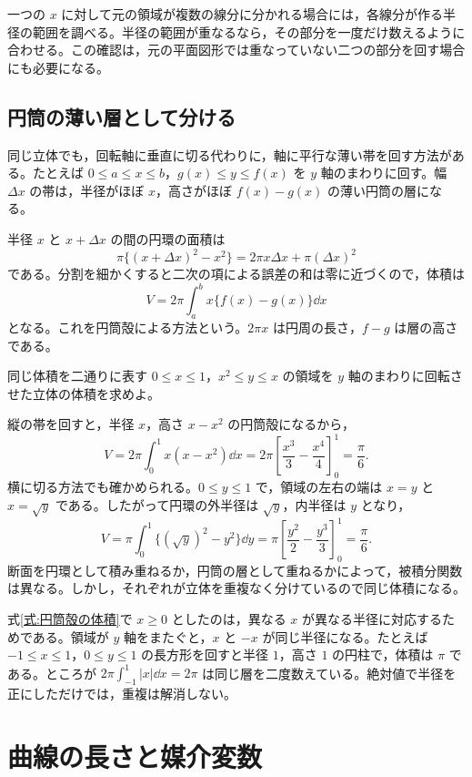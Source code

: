 一つの $x$ に対して元の領域が複数の線分に分かれる場合には，各線分が作る半径の範囲を調べる。半径の範囲が重なるなら，その部分を一度だけ数えるように合わせる。この確認は，元の平面図形では重なっていない二つの部分を回す場合にも必要になる。

\subsection{円筒の薄い層として分ける}

同じ立体でも，回転軸に垂直に切る代わりに，軸に平行な薄い帯を回す方法がある。たとえば $0\leq a\leq x\leq b$，$g(x)\leq y\leq f(x)$ を $y$ 軸のまわりに回す。幅 $\Delta x$ の帯は，半径がほぼ $x$，高さがほぼ $f(x)-g(x)$ の薄い円筒の層になる。

半径 $x$ と $x+\Delta x$ の間の円環の面積は
\[
\pi\{(x+\Delta x)^2-x^2\}
 =2\pi x\Delta x+\pi(\Delta x)^2
\]
である。分割を細かくすると二次の項による誤差の和は零に近づくので，体積は
\begin{equation}\label{式:円筒殻の体積}
V=2\pi\int_a^b x\{f(x)-g(x)\}\dd x
\end{equation}
となる。これを円筒殻による方法という。$2\pi x$ は円周の長さ，$f-g$ は層の高さである。

\begin{example}{同じ体積を二通りに表す}
$0\leq x\leq1$，$x^2\leq y\leq x$ の領域を $y$ 軸のまわりに回転させた立体の体積を求めよ。
\end{example}

縦の帯を回すと，半径 $x$，高さ $x-x^2$ の円筒殻になるから，
\[
V=2\pi\int_0^1x(x-x^2)\dd x
 =2\pi\left[\frac{x^3}{3}-\frac{x^4}{4}\right]_0^1
 =\frac{\pi}{6}.
\]
横に切る方法でも確かめられる。$0\leq y\leq1$ で，領域の左右の端は $x=y$ と $x=\sqrt y$ である。したがって円環の外半径は $\sqrt y$，内半径は $y$ となり，
\[
V=\pi\int_0^1\{(\sqrt y)^2-y^2\}\dd y
 =\pi\left[\frac{y^2}{2}-\frac{y^3}{3}\right]_0^1
 =\frac{\pi}{6}.
\]
断面を円環として積み重ねるか，円筒の層として重ねるかによって，被積分関数は異なる。しかし，それぞれが立体を重複なく分けているので同じ体積になる。

式\eqref{式:円筒殻の体積}で $x\geq0$ としたのは，異なる $x$ が異なる半径に対応するためである。領域が $y$ 軸をまたぐと，$x$ と $-x$ が同じ半径になる。たとえば $-1\leq x\leq1$，$0\leq y\leq1$ の長方形を回すと半径 $1$，高さ $1$ の円柱で，体積は $\pi$ である。ところが $2\pi\int_{-1}^1|x|\dd x=2\pi$ は同じ層を二度数えている。絶対値で半径を正にしただけでは，重複は解消しない。

\section{曲線の長さと媒介変数}\label{節:曲線の弧長}

